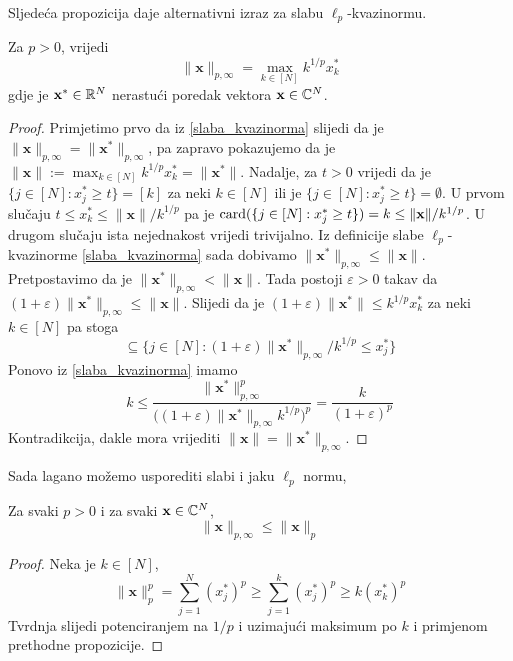 \documentclass[a4paper,twoside,12pt]{memoir} %
\newcommand{\vect}[1]{\mathbf{#1}}
\newcommand{\card}{\text{\normalfont{card}}}
\begin{document}
\noindent Sljede\'ca propozicija daje alternativni izraz za slabu $\ell_p$-kvazinormu.
\begin{prop}\label{slaba_kvazinorma_2}
    Za $p>0$, vrijedi
    \begin{equation*}
        \|\vect{x}\|_{p, \infty} = \max \limits_{k \in [N]}k^{1/p}x_k^{*}
    \end{equation*}
    gdje je $\vect{x}^* \in \R^N$ nerastu\'ci poredak vektora $\vect{x}\in \C^N$.
\end{prop}
\begin{proof}
    Primjetimo prvo da iz \eqref{slaba_kvazinorma} slijedi da je $\|\vect{x}\|_{p, \infty}=\|\vect{x}^*\|_{p, \infty}$, pa zapravo pokazujemo da je $\|\vect{x}\|:= \max_{k \in [N]}k^{1/p}x_k^* = \|\vect{x}^*\|$. Nadalje, za $t>0$ vrijedi da je $\{j \in [N]: x^*_j \geq t\}=[k]$ za neki $k \in [N]$ ili je $\{j \in [N]: x^*_j \geq t\}=\emptyset$. U prvom slu\v{c}aju $t \leq x^*_k \leq \|\vect{x}\|/k^{1/p}$ pa je $\card(\{j \in [N]:x_j^* \geq t \}) = k \leq \|\vect{x}\|/k^{1/p}$. U drugom slu\v{c}aju ista nejednakost vrijedi trivijalno. Iz definicije slabe $\ell_p$-kvazinorme \eqref{slaba_kvazinorma} sada dobivamo $\|\vect{x}^*\|_{p, \infty} \leq \|\vect{x}\|$. Pretpostavimo da je $\|\vect{x}^*\|_{p, \infty} < \|\vect{x}\|$. Tada postoji $\varepsilon > 0$ takav da $(1+ \varepsilon)\|\vect{x}^*\|_{p, \infty} \leq \|\vect{x}\|$. Slijedi da je $(1 + \varepsilon)\|\vect{x}^*\| \leq  k^{1/p}x^*_k$ za neki $k \in [N]$ pa stoga
    \begin{equation*}
        [k] \subseteq \big\{ j \in [N] : (1 + \varepsilon)\|\vect{x}^*\|_{p, \infty}/k^{1/p} \leq x_j^* \big\}
    \end{equation*}
    Ponovo iz \eqref{slaba_kvazinorma} imamo
    \begin{equation*}
        k \leq \frac{\|\vect{x}^*\|^p_{p, \infty}}{\big( (1 + \varepsilon)\|\vect{x}^*\|_{p, \infty}k^{1/p}\big)^p}=\frac{k}{(1 + \varepsilon)^p}
    \end{equation*}
    Kontradikcija, dakle mora vrijediti $\|\vect{x}\| = \|\vect{x}^*\|_{p, \infty}$.
\end{proof}
\noindent Sada lagano mo\v{z}emo usporediti slabi i jaku $\ell_p$ normu,
\begin{prop}
    Za svaki $p > 0$ i za svaki $\vect{x} \in \C^N$,
    \begin{equation*}
        \|\vect{x}\|_{p, \infty} \leq \|\vect{x}\|_p
    \end{equation*}
\end{prop}
\begin{proof}
    Neka je $k \in [N]$,
    \begin{equation*}
        \|\vect{x}\|_p^p = \sum_{j=1}^{N}(x_j^*)^p \geq \sum_{j=1}^{k}(x_j^*)^p \geq k(x_k^*)^p
    \end{equation*}
    Tvrdnja slijedi potenciranjem na $1/p$ i uzimaju\'ci maksimum po $k$ i primjenom prethodne propozicije.
\end{proof}
\end{document}
